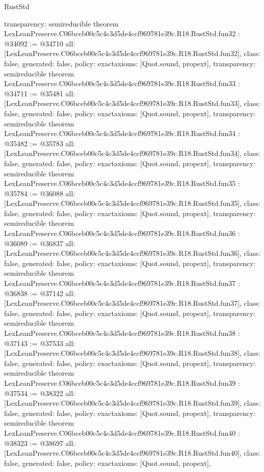 \begin{lexlean}{RustStd}
\begin{coremodule}
{  transparency: semireducible
}
theorem LexLeanPreserve.C06bceb00c5c4c3d5de4ccf969781e39c.R18.RustStd.fun32 : @34092 := @34710 {
  all: [LexLeanPreserve.C06bceb00c5c4c3d5de4ccf969781e39c.R18.RustStd.fun32],
  class: false,
  generated: false,
  policy: exact{axioms: [Quot.sound, propext]},
  transparency: semireducible
}
theorem LexLeanPreserve.C06bceb00c5c4c3d5de4ccf969781e39c.R18.RustStd.fun33 : @34711 := @35481 {
  all: [LexLeanPreserve.C06bceb00c5c4c3d5de4ccf969781e39c.R18.RustStd.fun33],
  class: false,
  generated: false,
  policy: exact{axioms: [Quot.sound, propext]},
  transparency: semireducible
}
theorem LexLeanPreserve.C06bceb00c5c4c3d5de4ccf969781e39c.R18.RustStd.fun34 : @35482 := @35783 {
  all: [LexLeanPreserve.C06bceb00c5c4c3d5de4ccf969781e39c.R18.RustStd.fun34],
  class: false,
  generated: false,
  policy: exact{axioms: [Quot.sound, propext]},
  transparency: semireducible
}
theorem LexLeanPreserve.C06bceb00c5c4c3d5de4ccf969781e39c.R18.RustStd.fun35 : @35784 := @36088 {
  all: [LexLeanPreserve.C06bceb00c5c4c3d5de4ccf969781e39c.R18.RustStd.fun35],
  class: false,
  generated: false,
  policy: exact{axioms: [Quot.sound, propext]},
  transparency: semireducible
}
theorem LexLeanPreserve.C06bceb00c5c4c3d5de4ccf969781e39c.R18.RustStd.fun36 : @36089 := @36837 {
  all: [LexLeanPreserve.C06bceb00c5c4c3d5de4ccf969781e39c.R18.RustStd.fun36],
  class: false,
  generated: false,
  policy: exact{axioms: [Quot.sound, propext]},
  transparency: semireducible
}
theorem LexLeanPreserve.C06bceb00c5c4c3d5de4ccf969781e39c.R18.RustStd.fun37 : @36838 := @37142 {
  all: [LexLeanPreserve.C06bceb00c5c4c3d5de4ccf969781e39c.R18.RustStd.fun37],
  class: false,
  generated: false,
  policy: exact{axioms: [Quot.sound, propext]},
  transparency: semireducible
}
theorem LexLeanPreserve.C06bceb00c5c4c3d5de4ccf969781e39c.R18.RustStd.fun38 : @37143 := @37533 {
  all: [LexLeanPreserve.C06bceb00c5c4c3d5de4ccf969781e39c.R18.RustStd.fun38],
  class: false,
  generated: false,
  policy: exact{axioms: [Quot.sound, propext]},
  transparency: semireducible
}
theorem LexLeanPreserve.C06bceb00c5c4c3d5de4ccf969781e39c.R18.RustStd.fun39 : @37534 := @38322 {
  all: [LexLeanPreserve.C06bceb00c5c4c3d5de4ccf969781e39c.R18.RustStd.fun39],
  class: false,
  generated: false,
  policy: exact{axioms: [Quot.sound, propext]},
  transparency: semireducible
}
theorem LexLeanPreserve.C06bceb00c5c4c3d5de4ccf969781e39c.R18.RustStd.fun40 : @38323 := @38697 {
  all: [LexLeanPreserve.C06bceb00c5c4c3d5de4ccf969781e39c.R18.RustStd.fun40],
  class: false,
  generated: false,
  policy: exact{axioms: [Quot.sound, propext]},
}
\end{coremodule}
\end{lexlean}

